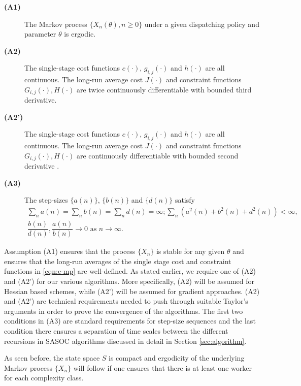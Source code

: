 \documentclass[11pt,letterpaper,english]{article}
\begin{document}
\begin{description}
\item[\textbf{(A1)}] The Markov process $\{X_n(\theta) , n \geq
0\}$ under a given dispatching policy and parameter $\theta$ is ergodic.
\item[\textbf{(A2)}] The single-stage cost functions $c(\cdot)$,
$g_{i,j}(\cdot)$ and $h(\cdot)$ are all continuous. The long-run average cost
$J(\cdot)$ and constraint functions $G_{i,j}(\cdot), H(\cdot)$ are twice
continuously differentiable with bounded third derivative.
\item[\textbf{(A2')}] The single-stage cost functions $c(\cdot)$,
$g_{i,j}(\cdot)$ and $h(\cdot)$ are all continuous. The long-run average cost
$J(\cdot)$  and constraint functions $G_{i,j}(\cdot), H(\cdot)$ are continuously
differentiable with bounded second derivative .
\item[\textbf{(A3)}] The step-sizes $\{a(n)\}$, $\{b(n)\}$ and $\{d(n)\}$
satisfy
\[
\begin{array}{l}
\sum_{n} a(n) = \sum_{n} b(n) = \sum_n d(n) =\infty; \sum_n (a^2(n) + b^2(n) +
d^2(n)) < \infty,\\[2ex]
\dfrac{b(n)}{d(n)}, \dfrac{a(n)}{b(n)} \rightarrow 0 \text{ as } n \rightarrow
\infty.
\end{array}
\]
\end{description}

Assumption (A1) ensures that the process $\{X_n\}$ is stable for any given
$\theta$ and ensures that the long-run averages of the single stage cost and
constraint functions in \eqref{eqn:c-mp} are well-defined.
As stated earlier, we require one of (A2) and (A2') for our various algorithms. More
specifically, (A2) will be assumed for Hessian based schemes, while (A2') will
be assumed for gradient approaches. (A2) and (A2') are technical requirements
needed to push through suitable Taylor's arguments in order to prove the
convergence of the algorithms. The first two conditions in (A3) are standard
requirements for step-size sequences and the last condition there ensures a separation of
time scales between the different recursions in SASOC algorithms discussed in
detail in Section \ref{sec:algorithm}.

\begin{remark}
    As seen before, the state space $S$ is compact and ergodicity of the
underlying Markov process $\{X_n\}$ will follow if one ensures that there
is at least one worker for each complexity class.
\end{remark}
\end{document}
